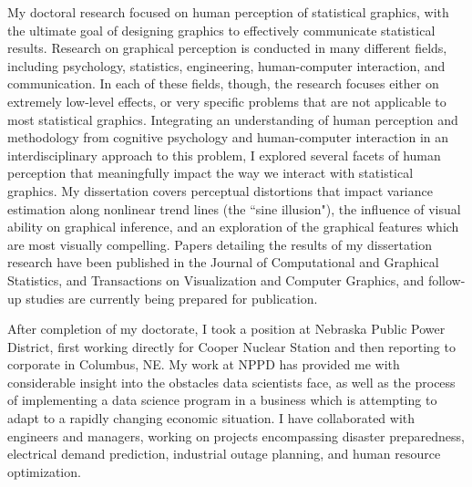 \documentclass[12pt, letterpaper, sans]{moderncv}
\begin{document}
My doctoral research focused on human perception of statistical graphics, with the ultimate goal of designing graphics to effectively communicate statistical results. Research on graphical perception is conducted in many different fields, including psychology, statistics, engineering, human-computer interaction, and communication. In each of these fields, though, the research focuses either on extremely low-level effects, or very specific problems that are not applicable to most statistical graphics. Integrating an understanding of human perception and methodology from cognitive psychology and human-computer interaction in an interdisciplinary approach to this problem, I explored several facets of human perception that meaningfully impact the way we interact with statistical graphics. My dissertation covers perceptual distortions that impact variance estimation along nonlinear trend lines (the ``sine illusion"), the influence of visual ability on graphical inference, and an exploration of the graphical features which are most visually compelling. Papers detailing the results of my dissertation research have been published in the Journal of Computational and Graphical Statistics, and Transactions on Visualization and Computer Graphics, and follow-up studies are currently being prepared for publication. 

After completion of my doctorate, I took a position at Nebraska Public Power District, first working directly for Cooper Nuclear Station and then reporting to corporate in Columbus, NE. My work at NPPD has provided me with considerable insight into the obstacles data scientists face, as well as the process of implementing a data science program in a business which is attempting to adapt to a rapidly changing economic situation. I have collaborated with engineers and managers, working on projects encompassing disaster preparedness, electrical demand prediction, industrial outage planning, and human resource optimization. 
\end{document}
